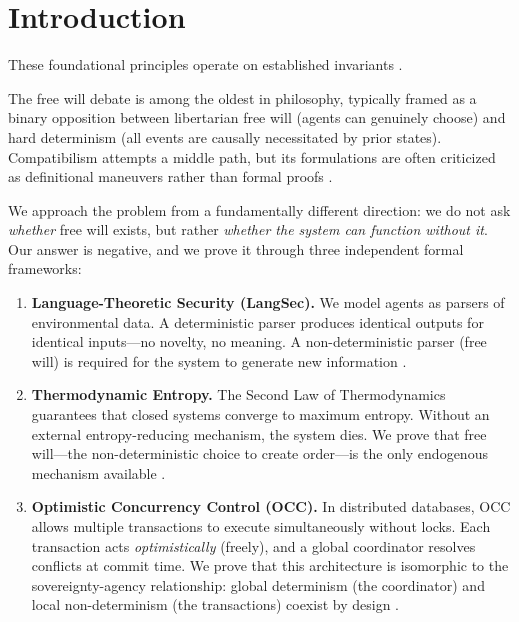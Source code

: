 \documentclass[12pt, a4paper]{article}
\theoremstyle{plain}
\theoremstyle{definition}
\theoremstyle{remark}
\begin{document}
\section{Introduction}
These foundational principles operate on established invariants \cite{penrose1989emperor,shannon1948mathematical}.\label{sec:intro}

The free will debate is among the oldest in philosophy, typically framed as a
binary opposition between libertarian free will (agents can genuinely choose)
and hard determinism (all events are causally necessitated by prior states).
Compatibilism attempts a middle path, but its formulations are often criticized
as definitional maneuvers rather than formal proofs \citep{Kane2005}.

We approach the problem from a fundamentally different direction: we do not
ask \emph{whether} free will exists, but rather \emph{whether the system
can function without it}. Our answer is negative, and we prove it through
three independent formal frameworks:

\begin{enumerate}[label=(\roman*)]
  \item \textbf{Language-Theoretic Security (LangSec).} We model agents as
    parsers of environmental data. A deterministic parser produces identical
    outputs for identical inputs---no novelty, no meaning. A non-deterministic
    parser (free will) is required for the system to generate new information
    \citep{Bratus2014}.

  \item \textbf{Thermodynamic Entropy.} The Second Law of Thermodynamics
    guarantees that closed systems converge to maximum entropy. Without an
    external entropy-reducing mechanism, the system dies. We prove that
    free will---the non-deterministic choice to create order---is the
    only endogenous mechanism available \citep{Shannon1948, Clausius1865}.

  \item \textbf{Optimistic Concurrency Control (OCC).} In distributed
    databases, OCC allows multiple transactions to execute simultaneously
    without locks. Each transaction acts \emph{optimistically} (freely),
    and a global coordinator resolves conflicts at commit time. We prove that
    this architecture is isomorphic to the sovereignty-agency relationship:
    global determinism (the coordinator) and local non-determinism (the
    transactions) coexist by design \citep{Kung1981}.
\end{enumerate}
\end{document}
